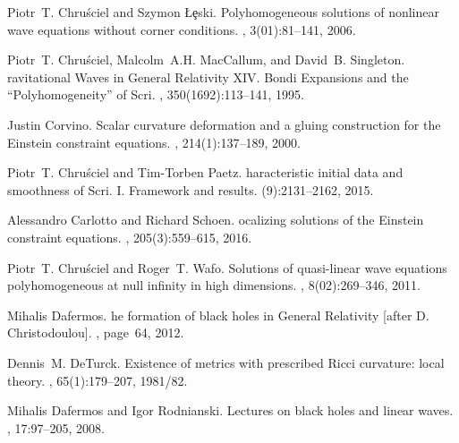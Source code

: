 \documentclass[reqno,11pt,letterpaper]{amsart}
\numberwithin{equation}{section}
\numberwithin{figure}{section}
\theoremstyle{definition}
\theoremstyle{remark}
\begin{document}
\begin{thebibliography}{GCHMG05}
Piotr~T. Chru{\'s}ciel and Szymon {\L}{\c{e}}ski.
\newblock Polyhomogeneous solutions of nonlinear wave equations without corner
  conditions.
, 3(01):81--141,
  2006.

Piotr~T. Chru{\'s}ciel, Malcolm~A.H. MacCallum, and David~B. Singleton.
ravitational {W}aves in {G}eneral {R}elativity {X}{I}{V}. {B}ondi
  {E}xpansions and the ``{P}olyhomogeneity'' of {S}cri.
, 350(1692):113--141, 1995.

Justin Corvino.
\newblock Scalar curvature deformation and a gluing construction for the
  {E}instein constraint equations.
, 214(1):137--189, 2000.

Piotr~T. Chru{\'s}ciel and Tim-Torben Paetz.
haracteristic initial data and smoothness of {S}cri. {I}.
  {F}ramework and results.
(9):2131--2162, 2015.

Alessandro Carlotto and Richard Schoen.
ocalizing solutions of the {E}instein constraint equations.
, 205(3):559--615, 2016.

Piotr~T. Chru{\'s}ciel and Roger~T. Wafo.
\newblock Solutions of quasi-linear wave equations polyhomogeneous at null
  infinity in high dimensions.
, 8(02):269--346,
  2011.

Mihalis Dafermos.
he formation of black holes in {G}eneral {R}elativity [after {D}.
  {C}hristodoulou].
, page~64, 2012.

Dennis~M. DeTurck.
\newblock Existence of metrics with prescribed {R}icci curvature: local theory.
, 65(1):179--207, 1981/82.

Mihalis Dafermos and Igor Rodnianski.
\newblock Lectures on black holes and linear waves.
, 17:97--205,
  2008.


\end{thebibliography}
\end{document}
